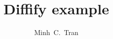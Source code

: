 \documentclass{article}
\begin{document}
\title{Diffify example}
\author{Minh~C.~Tran}

\maketitle




\end{document}
